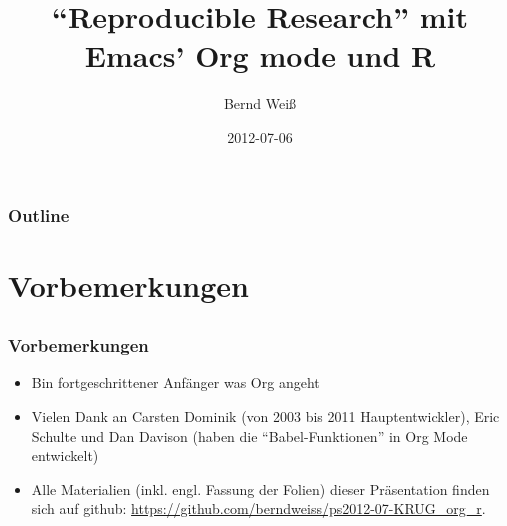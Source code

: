\documentclass[bigger]{beamer}
\institute{\url{http://berndweiss.net} \\ \url{bernd.weiss@uni-koeln.de}}
\title{\enquote{Reproducible Research} mit \newline Emacs' Org mode und R}
\author{Bernd Weiß}
\date{\footnotesize{2012-07-06}}
\begin{document}
\maketitle

\begin{frame}
\frametitle{Outline}
\setcounter{tocdepth}{3}
\tableofcontents
\end{frame}























\section{Vorbemerkungen}
\label{sec-1}
\subsection{}
\begin{frame}
\frametitle{Vorbemerkungen}
\label{sec-1-1-1}

\begin{itemize}
\item Bin fortgeschrittener Anfänger was Org angeht
\item Vielen Dank an Carsten Dominik (von 2003 bis 2011 Hauptentwickler), Eric Schulte und Dan Davison
  (haben die \enquote{Babel-Funktionen} in Org Mode entwickelt)
\item Alle Materialien (inkl. engl. Fassung der Folien) dieser Präsentation finden sich auf github: \href{https://github.com/berndweiss/ps2012-07-KRUG_org_r}{https://github.com/berndweiss/ps2012-07-KRUG\_org\_r}.
\end{itemize}
\end{frame}
\end{document}
